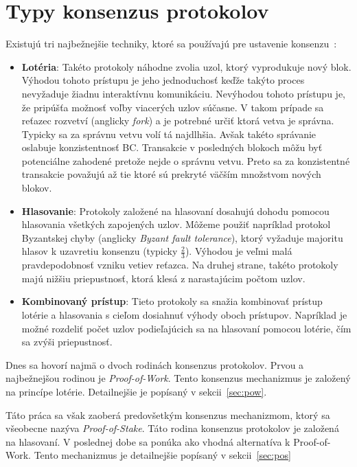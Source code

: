 \section{Typy konsenzus protokolov}
Existujú tri najbežnejšie techniky, ktoré sa používajú pre ustavenie konsenzu~\cite{zhangConsensus, homoliakBlockchain}:
\begin{itemize}
	\item \textbf{Lotéria}: Takéto protokoly náhodne zvolia uzol, ktorý vyprodukuje nový blok. Výhodou tohoto prístupu je jeho jednoduchosť keďže takýto proces nevyžaduje žiadnu interaktívnu komunikáciu. Nevýhodou tohoto prístupu je, že pripúšťa možnosť voľby viacerých uzlov súčasne. V takom prípade sa reťazec rozvetví (anglicky \textit{fork}) a je potrebné určiť ktorá vetva je správna. Typicky sa za správnu vetvu volí tá najdlhšia. Avšak takéto správanie oslabuje konzistentnosť BC. Transakcie v posledných blokoch môžu byť potenciálne zahodené pretože nejde o správnu vetvu. Preto sa za konzistentné transakcie považujú až tie ktoré sú prekryté väčším množstvom nových blokov.
	\item \textbf{Hlasovanie}: Protokoly založené na hlasovaní dosahujú dohodu pomocou hlasovania všetkých zapojených uzlov. Môžeme použiť napríklad protokol Byzantskej chyby (anglicky \textit{Byzant fault tolerance}), ktorý vyžaduje majoritu hlasov k uzavretiu konsenzu (typicky $\frac{2}{3}$). Výhodou je veľmi malá pravdepodobnosť vzniku vetiev reťazca. Na druhej strane, takéto protokoly majú nižšiu priepustnosť, ktorá klesá z narastajúcim počtom uzlov.
	\item \textbf{Kombinovaný prístup}: Tieto protokoly sa snažia kombinovať prístup lotérie a hlasovania s cieľom dosiahnuť výhody oboch prístupov. Napríklad je možné rozdeliť počet uzlov podieľajúcich sa na hlasovaní pomocou lotérie, čím sa zvýši priepustnosť.
\end{itemize}

Dnes sa hovorí najmä o dvoch rodinách konsenzus protokolov. Prvou a najbežnejšou rodinou je \textit{Proof-of-Work}. Tento konsenzus mechanizmus je založený na princípe lotérie. Detailnejšie je popísaný v sekcii~\ref{sec:pow}.

Táto práca sa však zaoberá predovšetkým konsenzus mechanizmom, ktorý sa všeobecne nazýva \textit{Proof-of-Stake}. Táto rodina konsenzus protokolov je založená na hlasovaní. V poslednej dobe sa ponúka ako vhodná alternatíva k Proof-of-Work. Tento mechanizmus je detailnejšie popísaný v sekcii~\ref{sec:pos}

